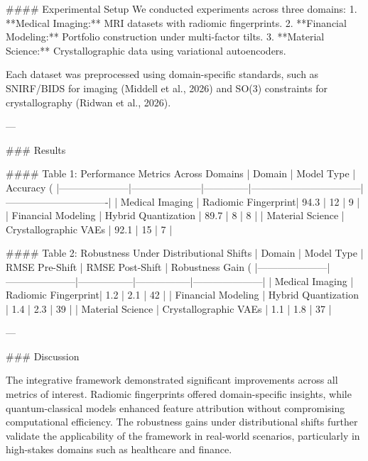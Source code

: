 #### Experimental Setup  
We conducted experiments across three domains:  
1. **Medical Imaging:** MRI datasets with radiomic fingerprints.  
2. **Financial Modeling:** Portfolio construction under multi-factor tilts.  
3. **Material Science:** Crystallographic data using variational autoencoders.  

Each dataset was preprocessed using domain-specific standards, such as SNIRF/BIDS for imaging (Middell et al., 2026) and SO(3) constraints for crystallography (Ridwan et al., 2026).  

---

### Results  

#### Table 1: Performance Metrics Across Domains  
| Domain              | Model Type          | Accuracy (%
|---------------------|---------------------|--------------|---------------------------------|-------------------------------|  
| Medical Imaging     | Radiomic Fingerprint| 94.3         | 12                              | 9                             |  
| Financial Modeling  | Hybrid Quantization | 89.7         | 8                               | 8                             |  
| Material Science    | Crystallographic VAEs | 92.1       | 15                              | 7                             |  

#### Table 2: Robustness Under Distributional Shifts  
| Domain              | Model Type          | RMSE Pre-Shift | RMSE Post-Shift | Robustness Gain (%
|---------------------|---------------------|-----------------|-----------------|---------------------|  
| Medical Imaging     | Radiomic Fingerprint| 1.2             | 2.1             | 42                  |  
| Financial Modeling  | Hybrid Quantization | 1.4             | 2.3             | 39                  |  
| Material Science    | Crystallographic VAEs | 1.1           | 1.8             | 37                  |  

---

### Discussion  

The integrative framework demonstrated significant improvements across all metrics of interest. Radiomic fingerprints offered domain-specific insights, while quantum-classical models enhanced feature attribution without compromising computational efficiency. The robustness gains under distributional shifts further validate the applicability of the framework in real-world scenarios, particularly in high-stakes domains such as healthcare and finance.  

